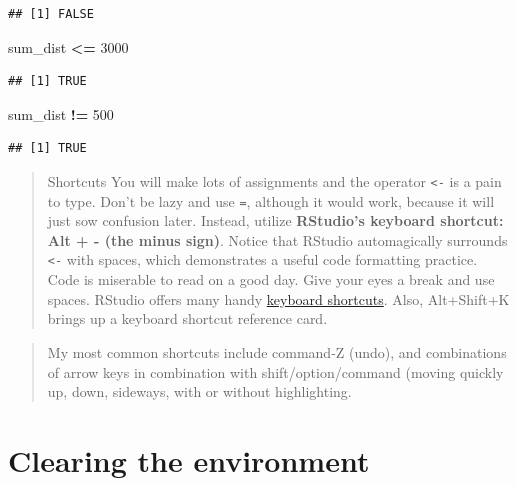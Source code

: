 \documentclass[]{book}
\newenvironment{Shaded}{\begin{snugshade}}{\end{snugshade}}
\newcommand{\DecValTok}[1]{\textcolor[rgb]{0.00,0.00,0.81}{#1}}
\newcommand{\NormalTok}[1]{#1}
\newcommand{\OperatorTok}[1]{\textcolor[rgb]{0.81,0.36,0.00}{\textbf{#1}}}
\newcommand{\StringTok}[1]{\textcolor[rgb]{0.31,0.60,0.02}{#1}}
\begin{document}
\begin{verbatim}
## [1] FALSE
\end{verbatim}

\begin{Shaded}
\begin{Highlighting}[]
\NormalTok{sum_dist }\OperatorTok{<=}\StringTok{ }\DecValTok{3000}
\end{Highlighting}
\end{Shaded}

\begin{verbatim}
## [1] TRUE
\end{verbatim}

\begin{Shaded}
\begin{Highlighting}[]
\NormalTok{sum_dist }\OperatorTok{!=}\StringTok{ }\DecValTok{500}
\end{Highlighting}
\end{Shaded}

\begin{verbatim}
## [1] TRUE
\end{verbatim}

\begin{quote}
Shortcuts
You will make lots of assignments and the operator \texttt{\textless{}-} is a pain to type. Don't be lazy and use \texttt{=}, although it would work, because it will just sow confusion later. Instead, utilize \textbf{RStudio's keyboard shortcut: Alt + - (the minus sign)}.
Notice that RStudio automagically surrounds \texttt{\textless{}-} with spaces, which demonstrates a useful code formatting practice. Code is miserable to read on a good day. Give your eyes a break and use spaces.
RStudio offers many handy \href{https://support.rstudio.com/hc/en-us/articles/200711853-Keyboard-Shortcuts}{keyboard shortcuts}. Also, Alt+Shift+K brings up a keyboard shortcut reference card.
\end{quote}

\begin{quote}
My most common shortcuts include command-Z (undo), and combinations of arrow keys in combination with shift/option/command (moving quickly up, down, sideways, with or without highlighting.
\end{quote}

\hypertarget{clearing-the-environment}{%
\section{Clearing the environment}\label{clearing-the-environment}}
\end{document}
